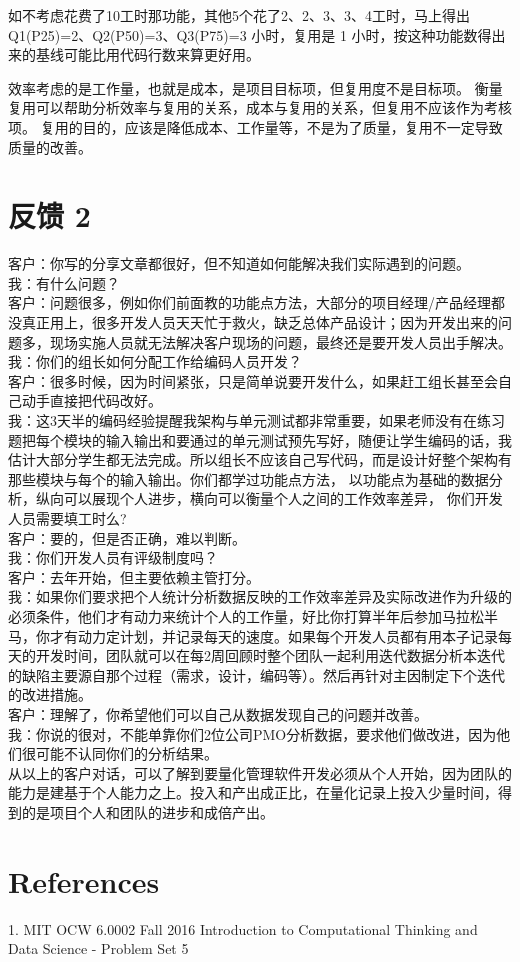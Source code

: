 如不考虑花费了10工时那功能，其他5个花了2、2、3、3、4工时，马上得出
Q1(P25)=2、Q2(P50)=3、Q3(P75)=3 小时，复用是 1
小时，按这种功能数得出来的基线可能比用代码行数来算更好用。

效率考虑的是工作量，也就是成本，是项目目标项，但复用度不是目标项。
衡量复用可以帮助分析效率与复用的关系，成本与复用的关系，但复用不应该作为考核项。
复用的目的，应该是降低成本、工作量等，不是为了质量，复用不一定导致质量的改善。

\hypertarget{ux53cdux9988-2}{%
\section{反馈 2}\label{ux53cdux9988-2}}

客户：你写的分享文章都很好，但不知道如何能解决我们实际遇到的问题。\\
我：有什么问题？\\
客户：问题很多，例如你们前面教的功能点方法，大部分的项目经理/产品经理都没真正用上，很多开发人员天天忙于救火，缺乏总体产品设计；因为开发出来的问题多，现场实施人员就无法解决客户现场的问题，最终还是要开发人员出手解决。\\
我：你们的组长如何分配工作给编码人员开发？\\
客户：很多时候，因为时间紧张，只是简单说要开发什么，如果赶工组长甚至会自己动手直接把代码改好。\\
我：这3天半的编码经验提醒我架构与单元测试都非常重要，如果老师没有在练习题把每个模块的输入输出和要通过的单元测试预先写好，随便让学生编码的话，我估计大部分学生都无法完成。所以组长不应该自己写代码，而是设计好整个架构有那些模块与每个的输入输出。你们都学过功能点方法，
以功能点为基础的数据分析，纵向可以展现个人进步，横向可以衡量个人之间的工作效率差异，
你们开发人员需要填工时么?\\
客户：要的，但是否正确，难以判断。\\
我：你们开发人员有评级制度吗？\\
客户：去年开始，但主要依赖主管打分。\\
我：如果你们要求把个人统计分析数据反映的工作效率差异及实际改进作为升级的必须条件，他们才有动力来统计个人的工作量，好比你打算半年后参加马拉松半马，你才有动力定计划，并记录每天的速度。如果每个开发人员都有用本子记录每天的开发时间，团队就可以在每2周回顾时整个团队一起利用迭代数据分析本迭代的缺陷主要源自那个过程（需求，设计，编码等）。然后再针对主因制定下个迭代的改进措施。\\
客户：理解了，你希望他们可以自己从数据发现自己的问题并改善。\\
我：你说的很对，不能单靠你们2位公司PMO分析数据，要求他们做改进，因为他们很可能不认同你们的分析结果。\\
从以上的客户对话，可以了解到要量化管理软件开发必须从个人开始，因为团队的能力是建基于个人能力之上。投入和产出成正比，在量化记录上投入少量时间，得到的是项目个人和团队的进步和成倍产出。\\

\hypertarget{references}{%
\section{References}\label{references}}

1. MIT OCW 6.0002 Fall 2016 Introduction to Computational Thinking and
Data Science - Problem Set 5\\




